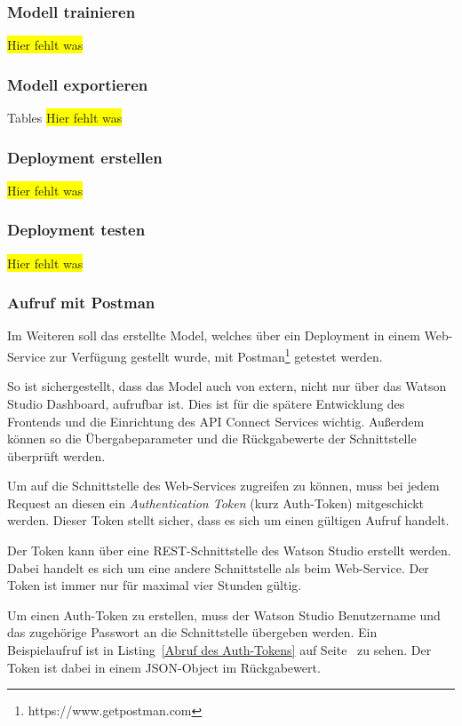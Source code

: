 \subsubsection{Modell trainieren}
\colorbox{yellow}{Hier fehlt was}

\subsubsection{Modell exportieren}
Tables
\colorbox{yellow}{Hier fehlt was}

\subsubsection{Deployment erstellen}
\colorbox{yellow}{Hier fehlt was}

\subsubsection{Deployment testen}
\colorbox{yellow}{Hier fehlt was}

\subsubsection{Aufruf mit Postman}
\label{subsec:Aufruf mit Postman}
Im Weiteren soll das erstellte Model, welches über ein Deployment in einem Web-Service zur Verfügung gestellt wurde,
mit Postman\footnote{https://www.getpostman.com} getestet werden.

So ist sichergestellt, dass das Model auch von extern, nicht nur über das Watson Studio Dashboard, aufrufbar ist.
Dies ist für die spätere Entwicklung des Frontends und die Einrichtung des API Connect Services wichtig. Außerdem können
so die Übergabeparameter und die Rückgabewerte der Schnittstelle überprüft werden.

Um auf die Schnittstelle des Web-Services zugreifen zu können, muss bei jedem Request an diesen ein
\textit{Authentication Token} (kurz Auth-Token) mitgeschickt werden. Dieser Token stellt sicher, dass es sich um einen
gültigen Aufruf handelt.

Der Token kann über eine REST-Schnittstelle des Watson Studio erstellt werden. Dabei handelt es sich um eine andere
Schnittstelle als beim Web-Service. Der Token ist immer nur für maximal vier Stunden gültig.

Um einen Auth-Token zu erstellen, muss der Watson Studio Benutzername und das zugehörige Passwort an die Schnittstelle
übergeben werden. Ein Beispielaufruf ist in Listing~\ref{Abruf des Auth-Tokens} auf Seite~\pageref{Abruf des Auth-Tokens}
zu sehen. Der Token ist dabei in einem JSON-Object im Rückgabewert.

